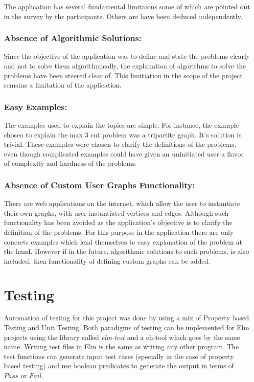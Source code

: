 The application has several fundamental limitaions some of which are pointed
out in the survey by the participants. Others are have been deduced
independently.

\subsubsection{Absence of Algorithmic Solutions:}
Since the objective of the application was to define and state the problems
clearly and not to solve them algorithmically, the explanation of algorithms to
solve the problems have been steered clear of. This limitiation in the scope of
the project remains a limitation of the application.

\subsubsection{Easy Examples:}
The examples used to explain the topics are simple. For instance, the exmaple
chosen to explain the max 3 cut problem was a tripartite graph.  It's solution
is trivial. These examples were chosen to clarify the definitions of the
problems, even though complicated examples could have given an uninitiated user
a flavor of complexity and hardness of the problems.

\subsubsection{Absence of Custom User Graphs Functionality:}
There are web applications on the internet, which allow the user to instantiate
their own graphs, with user instantiated vertices and edges. Although such
functionality has been avoided as the application's objective is to clarify the
definition of the problems. For this purpose in the application there are only
concrete examples which lend themselves to easy explanation of the problem at
the hand. However if in the future, algorithmic solutions to such problems, is
also included, then functionality of defining custom graphs can be added.

\section{Testing}
Automation of testing for this project was done by using a mix of Property
based Testing and Unit Testing. Both paradigms of testing can be implemented
for Elm projects using the library called \emph{elm-test} and a cli-tool which
goes by the same name. Writing test files in Elm is the same as writing any
other program. The test functions can generate input test cases (specially in
the case of property based testing) and use boolean predicates to generate the
output in terms of $Pass$ or $Fail$.

